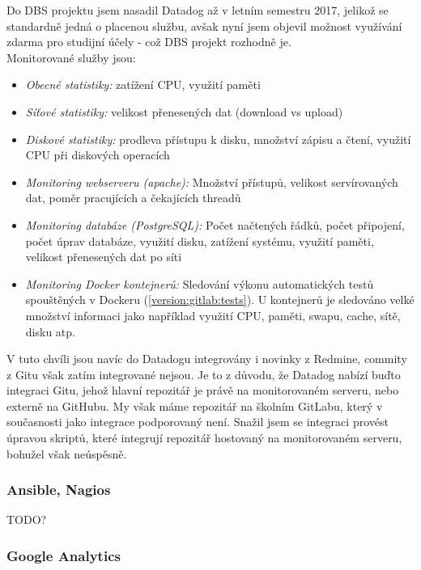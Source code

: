 Do DBS projektu jsem nasadil Datadog až v letním semestru 2017, jelikož se standardně jedná o placenou službu, avšak nyní jsem objevil možnost využívání zdarma pro studijní účely - což DBS projekt rozhodně je.\\
Monitorované služby jsou:
\begin{itemize}
	\item \emph{Obecné statistiky:} zatížení CPU, využití paměti
	\item \emph{Síťové statistiky:} velikost přenesených dat (download vs upload)
	\item \emph{Diskové statistiky:} prodleva přístupu k disku, množství zápisu a čtení, využití CPU při diskových operacích
	\item \emph{Monitoring webserveru (apache):} Množství přístupů, velikost servírovaných dat, poměr pracujících a čekajících threadů
	\item \emph{Monitoring databáze (PostgreSQL):} Počet načtených řádků, počet připojení, počet úprav databáze, využití disku, zatížení systému, využití paměti, velikost přenesených dat po síti
	\item \emph{Monitoring Docker kontejnerů:} Sledování výkonu automatických testů spouštěných v Dockeru (\ref{version:gitlab:tests}). U kontejnerů je sledováno velké množství informaci jako například využití CPU, paměti, swapu, cache, sítě, disku atp.
\end{itemize}
V tuto chvíli jsou navíc do Datadogu integrovány i novinky z Redmine, commity z Gitu však zatím integrované nejsou. Je to z důvodu, že Datadog nabízí buďto integraci Gitu, jehož hlavní repozitář je právě na monitorovaném serveru, nebo externě na GitHubu. My však máme repozitář na školním GitLabu, který v současnosti jako integrace podporovaný není. Snažil jsem se integraci provést úpravou skriptů, které integrují repozitář hostovaný na monitorovaném serveru, bohužel však neúspěsně.

\subsubsection{Ansible, Nagios}

TODO?

\subsubsection{Google Analytics}

